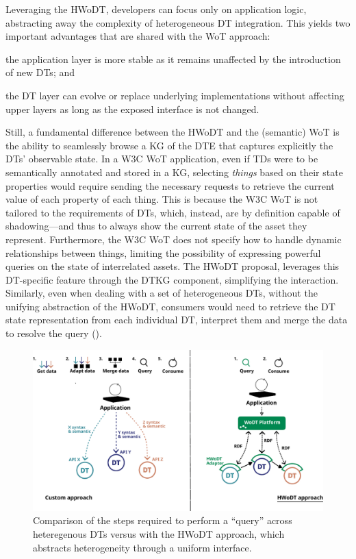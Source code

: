 Leveraging the \ac{HWoDT}, developers can focus only on application logic, abstracting away the complexity of heterogeneous \ac{DT} integration.  
This yields two important advantages that are shared with the \ac{WoT} approach:  
\begin{inlinelist}
    \item the application layer is more stable as it remains unaffected by the introduction of new \acp{DT};
    and  
    \item the \ac{DT} layer can evolve or replace underlying implementations without affecting upper layers as long as the exposed interface is not changed.
\end{inlinelist}

Still, a fundamental difference between the \ac{HWoDT} and the (semantic) \ac{WoT} is the ability to seamlessly browse a \ac{KG} of the \ac{DTE} that captures explicitly the \acp{DT}' observable state. 
%
In a W3C \ac{WoT} application, even if \acp{TD} were to be semantically annotated and stored in a \ac{KG}, selecting \emph{things} based on their state properties would require sending the necessary requests to retrieve the current value of each property of each thing.
%
This is because the W3C \ac{WoT} is not tailored to the requirements of \acp{DT}, which, instead, are by definition capable of shadowing---and thus to always show the current state of the asset they represent.
%
Furthermore, the W3C \ac{WoT} does not specify how to handle dynamic relationships between things, limiting the possibility of expressing powerful queries on the state of interrelated assets.
%
The \ac{HWoDT} proposal, leverages this \ac{DT}-specific feature through the \ac{DTKG} component, simplifying the interaction. 
%
Similarly, even when dealing with a set of heterogeneous \acp{DT}, without the unifying abstraction of the \ac{HWoDT}, consumers would need to retrieve the \ac{DT} state representation from each individual \ac{DT}, interpret them and merge the data to resolve the query ().

\begin{figure}
  \centering
  \includegraphics[width=\columnwidth]{figures/hwodt/comparison_custom_hwodt.pdf}
  \caption{Comparison of the steps required to perform a ``query'' across heteregenous \acp{DT} versus with the \ac{HWoDT} approach, which abstracts heterogeneity through a uniform interface.}
  \label{fig:comparison-custom-vs-hwodt}
\end{figure}

